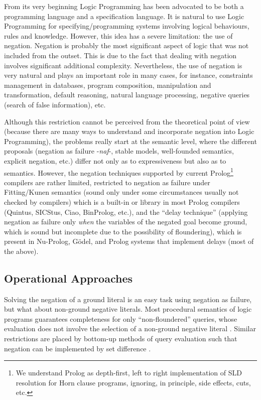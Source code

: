 \documentclass{tlp}
\newcommand{\naf}{{\em naf}}\newcommand{\viejo}[1]{}
\begin{document}
From its very beginning Logic Programming has been advocated to be
both a programming language and a specification language. It is
natural to use Logic Programming for specifying/programming systems
involving logical behaviours, rules and knowledge. However, this idea
has a severe limitation: the use of negation. Negation is probably the
most significant aspect of logic that was not included from the
outset. This is due to the fact that dealing with negation involves
significant additional complexity. Nevertheless, the use of negation
is very natural and plays an important role in many cases, for
instance, constraints management in databases, program composition,
manipulation and transformation, default reasoning, natural language
processing, negative queries (search of false information), etc.


Although this restriction cannot be perceived from the theoretical
point of view (because there are many ways to understand and
incorporate negation into Logic Programming), the problems really
start at the semantic level, where the different proposals (negation
as failure -\naf-, stable models, well-founded semantics, explicit
negation, etc.)  differ not only as to expressiveness but also as to
semantics.  However, the negation techniques supported by current
Prolog\footnote{We understand Prolog as depth-first, left to
right implementation of SLD resolution for Horn clause programs,
ignoring, in principle, side effects, cuts, etc.}  compilers are
rather limited, restricted to negation as failure under Fitting/Kunen
semantics \cite{Kunen} (sound only under some circumstances usually
not checked by compilers) which is a built-in or library in most
Prolog compilers (Quintus, SICStus, Ciao, BinProlog, etc.), and the
``delay technique'' (applying negation as failure only \emph{when} the
variables of the negated goal become ground, which is sound but
incomplete due to the possibility of floundering), which is present in
Nu-Prolog, G\"odel, and Prolog systems that implement delays (most of
the above).

\subsection{Operational Approaches}

Solving the negation of a ground literal is an easy task using
negation as failure, but what about non-ground negative
literals. Most procedural semantics of logic programs guarantees
completeness for only ``non-floundered'' queries, whose evaluation
does not involve the selection of a non-ground negative literal
\cite{Bol,Chen,Przymusinski1,Ross}. Similar restrictions are placed
by bottom-up methods of query evaluation such that negation can be
implemented by set difference \cite{Naughton,Stuckey93}.
\end{document}
